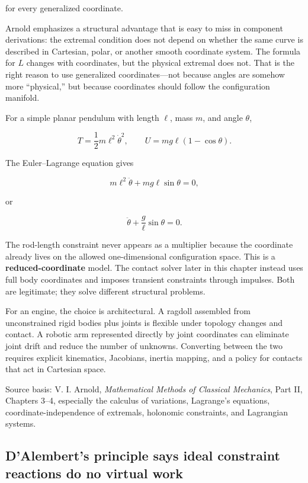 for every generalized coordinate.

Arnold emphasizes a structural advantage that is easy to miss in component derivations: the extremal condition does not depend on whether the same curve is described in Cartesian, polar, or another smooth coordinate system. The formula for \(L\) changes with coordinates, but the physical extremal does not. That is the right reason to use generalized coordinates---not because angles are somehow more ``physical,'' but because coordinates should follow the configuration manifold.

For a simple planar pendulum with length \(\ell\), mass \(m\), and angle \(\theta\),

\[
T=\frac12m\ell^2\dot\theta^2,
\qquad
U=mg\ell(1-\cos\theta).
\]

The Euler--Lagrange equation gives

\[
m\ell^2\ddot\theta
+
mg\ell\sin\theta
=
0,
\]

or

\[
\ddot\theta+\frac{g}{\ell}\sin\theta=0.
\]

The rod-length constraint never appears as a multiplier because the coordinate already lives on the allowed one-dimensional configuration space. This is a \textbf{reduced-coordinate} model. The contact solver later in this chapter instead uses full body coordinates and imposes transient constraints through impulses. Both are legitimate; they solve different structural problems.

For an engine, the choice is architectural. A ragdoll assembled from unconstrained rigid bodies plus joints is flexible under topology changes and contact. A robotic arm represented directly by joint coordinates can eliminate joint drift and reduce the number of unknowns. Converting between the two requires explicit kinematics, Jacobians, inertia mapping, and a policy for contacts that act in Cartesian space.

Source basis: V. I. Arnold, \emph{Mathematical Methods of Classical Mechanics}, Part II, Chapters 3--4, especially the calculus of variations, Lagrange's equations, coordinate-independence of extremals, holonomic constraints, and Lagrangian systems.

\subsection{D'Alembert's principle says ideal constraint reactions do no virtual work}\label{02-foundations-ii-ch039-dalemberts-principle-says-ideal-constraint-reactions-do-no-virtual-work}


